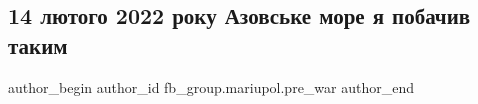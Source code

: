  
 
 
 
 

\subsection{14 лютого 2022 року Азовське море я побачив таким}
\label{sec:13_02_2023.fb.fb_group.mariupol.pre_war.3.14_lyutogo_2022_roku}

\ifcmt
 author_begin
   author_id fb_group.mariupol.pre_war
 author_end
\fi
